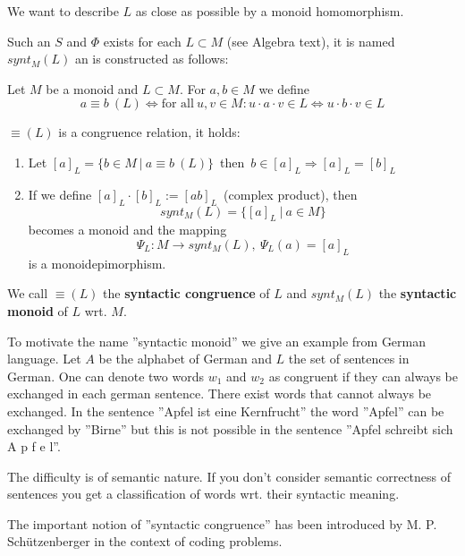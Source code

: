 We want to describe $L$ as close as possible by a monoid homomorphism.

Such an $S$ and $\Phi$ exists for each $L \subset M$ (see Algebra text), it is
named $synt_M(L)$ an is constructed as follows:

\begin{definition}
Let $M$ be a monoid and $L \subset M$. For $a, b \in M$ we define
\[ a \equiv b\ (L) \Leftrightarrow \mbox{for all}\ u, v \in M: u \cdot a \cdot v
\in L \Leftrightarrow u \cdot b \cdot v \in L
\]
\end{definition}

$\equiv (L)$ is a congruence relation, it holds:
\begin{enumerate}
  \item Let $[a]_L = \{ b \in M\ |\ a \equiv b\ (L) \}$\ then\ $b \in [a]_L
  \Rightarrow [a]_L = [b]_L $
  \item If we define $[a]_L \cdot [b]_L := [a b]_L$\ (complex product), then
  \[synt_M(L) = \{ [a]_L\ |\ a \in M \}\] becomes a monoid and the mapping
  \[\Psi_L : M \to synt_M(L),\ \Psi_L(a) = [a]_L\]
   is a monoidepimorphism.
\end{enumerate}

We call $\equiv (L)$ the {\bf syntactic congruence} of $L$ and $synt_M(L)$ the
{\bf syntactic monoid} of $L$ wrt. $M$.

To motivate the name ''syntactic monoid'' we give an example from German
language.
Let $A$ be the alphabet of German and $L$ the set of sentences in German. One can
denote two words $w_1$ and $w_2$ as congruent if they can always be exchanged in
each german sentence. There exist words that cannot always be exchanged. In the
sentence ''Apfel ist eine Kernfrucht'' the word ''Apfel'' can be exchanged by
''Birne'' but this is not possible in the sentence ''Apfel schreibt sich A p f e
l''.

The difficulty is of semantic nature. If you don't consider semantic correctness
of sentences you get a classification of words wrt. their syntactic meaning.

The important notion of ''syntactic congruence'' has been introduced by M. P.
Schützenberger in the context of coding problems.
